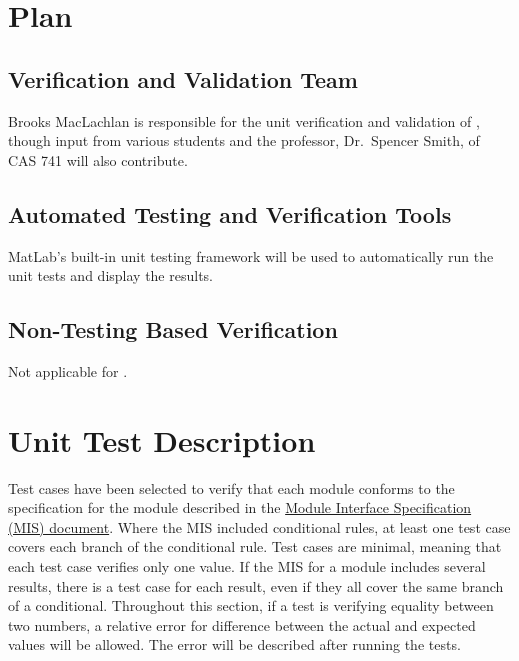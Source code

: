 \documentclass[12pt, titlepage]{article}
\begin{document}
\section{Plan} \label{sec_Plan}
	
\subsection{Verification and Validation Team}

\noindent Brooks MacLachlan is responsible for the unit verification and 
validation of \progname{}, though input from various students and the 
professor, Dr.~Spencer Smith, of CAS 741 will also contribute.

\subsection{Automated Testing and Verification Tools}

\noindent MatLab's built-in unit testing framework will be used to 
automatically run the unit tests and display the results.


\subsection{Non-Testing Based Verification}

Not applicable for \progname{}.

\section{Unit Test Description} \label{sec_Tests}

\noindent Test cases have been selected to verify that each module conforms to 
the specification for the module described in the 
\href{https://github.com/smiths/caseStudies/blob/master/CaseStudies/ssp/docs/Design/MIS/MIS.pdf}
{Module Interface Specification (MIS) document}. Where the MIS included 
conditional rules, at least one test case covers each branch of the conditional 
rule. Test cases are minimal, meaning that each test case verifies only one 
value. If the MIS for a module includes several results, there is a test case 
for each result, even if they all cover the same branch of a conditional. 
Throughout this section, if a test is verifying equality between two numbers, a 
relative error for difference between the actual and expected values will 
be allowed. The error will be described after running the tests. 
\end{document}
